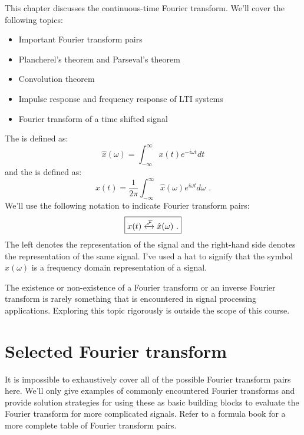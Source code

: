 This chapter discusses the continuous-time Fourier transform. We'll cover the following topics:
\begin{itemize}
    \item Important Fourier transform pairs
    \item Plancherel's theorem and Parseval's theorem 
    \item Convolution theorem
    \item Impulse response and frequency response of LTI systems
    \item Fourier transform of a time shifted signal
\end{itemize}

\noindent The \emph{} is defined as:
\begin{equation}
\boxed{
\hat{x}(\omega) = \int_{-\infty}^{\infty} x(t) e^{-i\omega t}dt}
\end{equation}
and the \emph{} is defined as:
\begin{equation}
\boxed{
x(t) = \frac{1}{2\pi}\int_{-\infty}^{\infty} \hat{x}(\omega) e^{i\omega t}d\omega\,\,.
}
\end{equation}
We'll use the following notation to indicate Fourier transform pairs:
\begin{equation}
\boxed{x(t) \xleftrightarrow{\mathcal{F}} \hat{x}(\omega)\,\,.}
\end{equation}
The left denotes the \emph{} representation of the signal and the right-hand side denotes the \emph{} representation of the same signal. I've used a hat to signify that the symbol $\hat{x}(\omega)$ is a frequency domain representation of a signal.

The existence or non-existence of a Fourier transform or an inverse Fourier transform is rarely something that is encountered in signal processing applications. Exploring this topic rigorously is outside the scope of this course.

\section{Selected Fourier transform}
It is impossible to exhaustively cover all of the possible Fourier transform pairs here. We'll only give examples of commonly encountered Fourier transforms and provide solution strategies for using these as basic building blocks to evaluate the Fourier transform for more complicated signals. Refer to a formula book\cite{kammler2007firs} for a more complete table of Fourier transform pairs.

